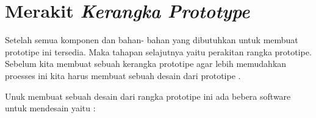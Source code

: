 \section{Merakit \textit{Kerangka Prototype}}
\par Setelah semua komponen dan bahan- bahan yang dibutuhkan untuk membuat prototipe ini tersedia. Maka tahapan selajutnya yaitu perakitan rangka prototipe. Sebelum kita membuat sebuah kerangka prototipe agar lebih memudahkan proesses ini kita harus membuat sebuah desain dari prototipe .

\par Unuk membuat sebuah desain dari rangka prototipe ini ada bebera software untuk mendesain yaitu :\\ \\ \\ \\ \\ 
